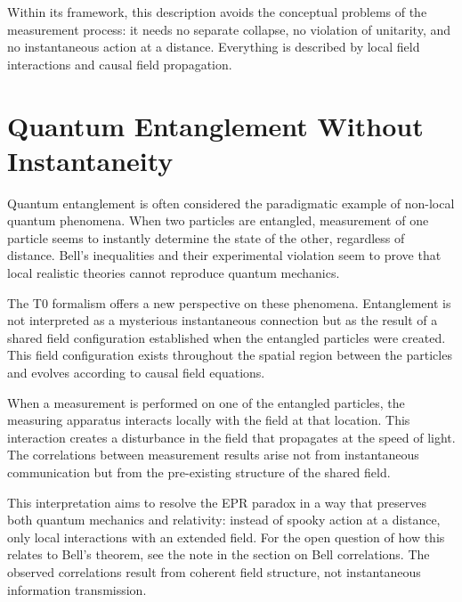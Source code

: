 	Within its framework, this description avoids the conceptual problems of the measurement process: it needs no separate collapse, no violation of unitarity, and no instantaneous action at a distance. Everything is described by local field interactions and causal field propagation.
	
	\section{Quantum Entanglement Without Instantaneity}
	
	Quantum entanglement is often considered the paradigmatic example of non-local quantum phenomena. When two particles are entangled, measurement of one particle seems to instantly determine the state of the other, regardless of distance. Bell's inequalities and their experimental violation seem to prove that local realistic theories cannot reproduce quantum mechanics.
	
	The T0 formalism offers a new perspective on these phenomena. Entanglement is not interpreted as a mysterious instantaneous connection but as the result of a shared field configuration established when the entangled particles were created. This field configuration exists throughout the spatial region between the particles and evolves according to causal field equations.
	
	When a measurement is performed on one of the entangled particles, the measuring apparatus interacts locally with the field at that location. This interaction creates a disturbance in the field that propagates at the speed of light. The correlations between measurement results arise not from instantaneous communication but from the pre-existing structure of the shared field.
	
	This interpretation aims to resolve the EPR paradox in a way that preserves both quantum mechanics and relativity: instead of spooky action at a distance, only local interactions with an extended field. For the open question of how this relates to Bell's theorem, see the note in the section on Bell correlations. The observed correlations result from coherent field structure, not instantaneous information transmission.

